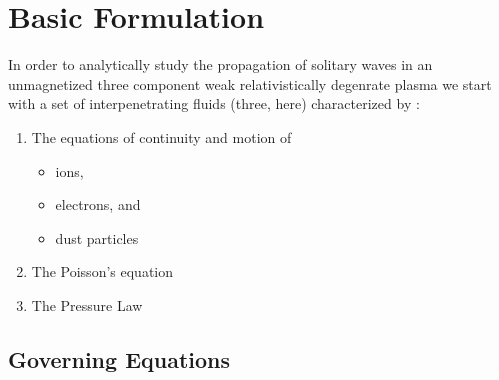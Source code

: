 \documentclass[journal]{IEEEtran}
\begin{document}
\section{Basic Formulation}

	\normalsize In order to analytically study the propagation of solitary waves in an unmagnetized three component weak relativistically degenrate plasma we start with a set of interpenetrating fluids (three, here) characterized by :
	
	\begin{enumerate}
		\item The equations of continuity and motion of 
		\begin{itemize}
			\item ions,
			\item electrons, and
			\item dust particles
		\end{itemize}
		\item The Poisson's equation
		\item The Pressure Law
	\end{enumerate}

\subsection{Governing Equations }
\end{document}
